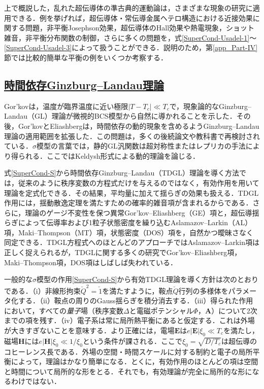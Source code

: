 \documentclass[a4paper,11pt]{ltjsarticle}
\newcommand{\subsectionlink}[1]{\subsection[#1]{\hyperlink{toc}{#1}}}
\begin{document}
上で概説した，乱れた超伝導体の準古典的運動論は，さまざまな現象の研究に適用できる．例を挙げれば，超伝導体・常伝導金属ヘテロ構造における近接効果に関する問題\cite{BelzigBruder,Gueron,Zhou,Hammer}，非平衡Josephson効果\cite{Heikkila,Wilhelm}，超伝導体のHall効果\cite{ZhouSpivak}や熱電現象\cite{StoofNazarov,Virtanen}，ショット雑音\cite{Stenberg}，非平衡分布関数の制御\cite{Crosser}，さらに多くの問題を，式\eqref{SuperCond-Usadel-1}〜\eqref{SuperCond-Usadel-3}によって扱うことができる．説明のため，第\ref{app_Part-IV}節では比較的簡単な平衡の例をいくつか考察する．

\subsectionlink{時間依存Ginzburg--Landau理論}\label{sec_SuperCond-3}

Gor'kov\cite{Gor'kov-GL}は，温度が臨界温度に近い極限$|T-T_{c}|\ll T_{c}$で，現象論的なGinzburg--Landau（GL）理論\cite{Ginzburg:1950sr}が微視的BCS模型から自然に導かれることを示した．その後，Gor'kovとEliashberg\cite{Gor'kovEliashberg}は，時間依存の動的現象を含めるようGinzburg--Landau理論の適用範囲を拡張した．この問題は，多くの後続論文\cite{HoughtonMaki,HuThompson,Kramer,SchonAmbegaokar,Hu,Krempasky,Otterlo}や教科書\cite{Tinkham,Kopnin,Larkin-Varlamov}で再検討されている．$\sigma$模型の言葉では，静的GL汎関数は超対称性\cite{AltlandSimons}またはレプリカ\cite{Yurkevich:2000an}の手法により得られる．ここではKeldysh形式による動的理論\cite{LevchenkoKamenev}を論じる．

式\eqref{SuperCond-S}から時間依存Ginzburg--Landau（TDGL）理論を導く方法では，従来のように秩序変数の方程式だけを与えるのではなく，有効作用を用いて理論を定式化できる．その結果，平均量に加えて揺らぎの効果も扱える．TDGL作用には，揺動散逸定理を満たすための確率的雑音項が含まれるからである．さらに，理論のゲージ不変性を保つ異常Gor'kov--Eliashberg（GE）項\cite{Gor'kovEliashberg}と，超伝導揺らぎによって伝導率および1粒子状態密度を繰り込むAslamazov--Larkin（AL）項\cite{AslamazovLarkin}，Maki--Thompson（MT）項\cite{Maki}，状態密度（DOS）項\cite{Hurault}を，自然かつ曖昧さなく同定できる．TDGL方程式へのほとんどのアプローチではAslamazov--Larkin項は正しく捉えられるが，TDGLに関する多くの研究でGor'kov--Eliashberg項，Maki--Thompson項，DOS項はしばしば失われている．

一般的な$\sigma$模型の作用\eqref{SuperCond-S}から有効TDGL理論を導く方針は次のとおりである．（i）非線形拘束$\check Q^2=\check{1}$を満たすように，鞍点$\check Q$行列の多様体をパラメータ化する．（ii）鞍点の周りのGauss揺らぎを積分消去する．（iii）得られた作用において，すべての\textit{量子}場（秩序変数$\Delta$と電磁ポテンシャル$\Phi$，$\mathbf{A}$）について2次までの項を残す．（iv）電子系は常に局所熱平衡にあると仮定する．これは外場が大きすぎないことを意味する．より正確には，電場$\mathbf{E}$は$e|\mathbf{E}|\xi_0\ll T_c$を満たし，磁場$\mathbf{H}$には$e|\mathbf{H}|\xi_0\ll1/\xi_0$という条件が課される．ここで$\xi_{0}=\sqrt{D/T_{c}}$は超伝導のコヒーレンス長である．外場の空間・時間スケールに対する制約と電子の局所平衡によって，理論はかなり簡単になる．とくに，有効作用のほとんどの項は空間と時間について局所的な形をとる．それでも，有効理論が完全に局所的な形になるわけではない．
\end{document}
